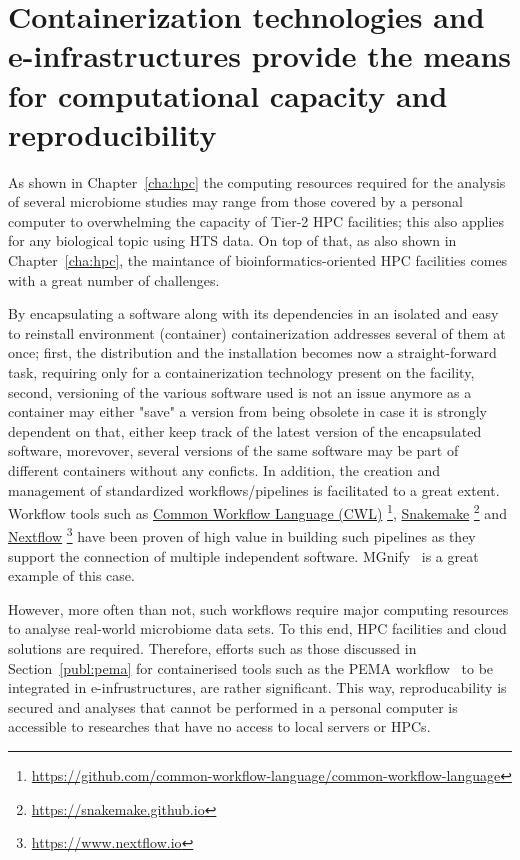 \section{Containerization technologies and e-infrastructures provide the means for computational capacity and reproducibility} 
\label{concl:comput}
   
      As shown in Chapter~\ref{cha:hpc} the computing resources required for the analysis of several 
      microbiome studies may range from those covered by a personal computer to overwhelming the capacity
      of Tier-2 HPC facilities;
      this also applies for any biological topic using HTS data. 
      On top of that, as also shown in Chapter~\ref{cha:hpc}, the maintance of bioinformatics-oriented HPC facilities 
      comes with a great number of challenges. 
   
      By encapsulating a software along with its dependencies in an isolated and easy to reinstall environment (container) 
      containerization addresses several of them at once; 
      first, the distribution and the installation becomes now a straight-forward task, requiring only for a containerization technology 
      present on the facility,
      second, versioning of the various software used is not an issue anymore as a container may either "save" a version from being obsolete
      in case it is strongly dependent on that, either keep track of the latest version of the encapsulated software, 
      morevover, several versions of the same software may be part of different containers without any conficts.
      In addition, the creation and management of standardized workflows/pipelines is facilitated to a great extent. 
      Workflow tools such as 
      \href{https://github.com/common-workflow-language/common-workflow-language}{Common Workflow Language (CWL)}
      \footnote{\href{https://github.com/common-workflow-language/common-workflow-language}{https://github.com/common-workflow-language/common-workflow-language}}, 
      \href{https://snakemake.github.io}{Snakemake} 
      \footnote{\href{https://snakemake.github.io}{https://snakemake.github.io}}
      and 
      \href{https://www.nextflow.io}{Nextflow}
      \footnote{\href{https://www.nextflow.io}{https://www.nextflow.io}}
      have been proven of high value 
      in building such pipelines as they support the connection of multiple independent software.
      MGnify~\citep{mitchell2020mgnify} is a great example of this case. 
   
      However, more often than not, such workflows require major computing resources to analyse
      real-world microbiome data sets.
      To this end, HPC facilities and cloud solutions are required. 
      Therefore, efforts such as those discussed in Section~\ref{publ:pema} 
      for containerised tools such as the PEMA workflow~\citep{zafeiropoulos2020pema}
      to be integrated in e-infrustructures, are rather significant. 
      This way, reproducability is secured and analyses that cannot be performed in a personal computer
      is accessible to researches that have no access to local servers or HPCs. 

